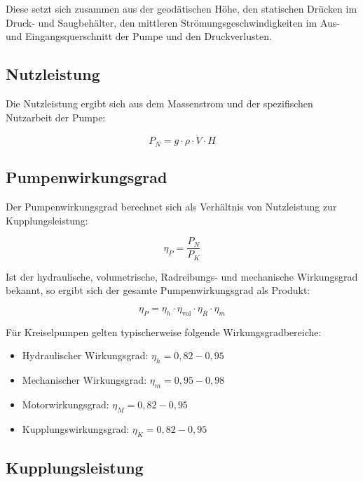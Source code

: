 Diese setzt sich zusammen aus der geodätischen Höhe, den statischen Drücken im Druck- und Saugbehälter, den mittleren Strömungsgeschwindigkeiten im Aus- und Eingangsquerschnitt der Pumpe und den Druckverlusten.

\subsection*{Nutzleistung}

Die Nutzleistung ergibt sich aus dem Massenstrom und der spezifischen Nutzarbeit der Pumpe:

\begin{equation}
	P_N = g \cdot \rho \cdot \dot{V} \cdot H
\end{equation}

\subsection*{Pumpenwirkungsgrad}

Der Pumpenwirkungsgrad berechnet sich als Verhältnis von Nutzleistung zur Kupplungsleistung:

\begin{equation}
	\eta_P = \frac{P_N}{P_K}
\end{equation}

Ist der hydraulische, volumetrische, Radreibungs- und mechanische Wirkungsgrad bekannt, so ergibt sich der gesamte Pumpenwirkungsgrad als Produkt:

\begin{equation}
	\eta_P = \eta_h \cdot \eta_{\text{vol}} \cdot \eta_R \cdot \eta_m
\end{equation}

Für Kreiselpumpen gelten typischerweise folgende Wirkungsgradbereiche:

\begin{itemize}
	\item Hydraulischer Wirkungsgrad: \( \eta_h = 0{,}82 - 0{,}95 \)
	\item Mechanischer Wirkungsgrad: \( \eta_m = 0{,}95 - 0{,}98 \)
	\item Motorwirkungsgrad: \( \eta_M = 0{,}82 - 0{,}95 \)
	\item Kupplungswirkungsgrad: \( \eta_K = 0{,}82 - 0{,}95 \)
\end{itemize}

\subsection*{Kupplungsleistung}

